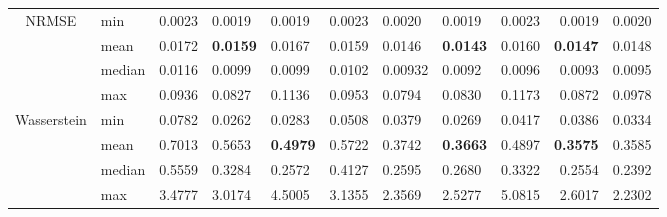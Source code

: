 \begin{table}[tbp]
\begin{tabular}{clllllllrrr}
\multirow{4}{*}{NRMSE}       & \multicolumn{1}{l|}{min}    & 0.0023                     & 0.0019                      & \multicolumn{1}{l|}{0.0019}          & 0.0023                & 0.0020                 & \multicolumn{1}{l|}{0.0019}          & 0.0023                     & 0.0019                     & 0.0020                     \\
                             & \multicolumn{1}{l|}{mean}   & 0.0172                     & \textbf{0.0159}             & \multicolumn{1}{l|}{0.0167}          & 0.0159                & 0.0146                 & \multicolumn{1}{l|}{\textbf{0.0143}} & 0.0160                     & \textbf{0.0147}            & 0.0148                     \\
                             & \multicolumn{1}{l|}{median} & 0.0116                     & 0.0099                      & \multicolumn{1}{l|}{0.0099}          & 0.0102                & 0.00932                 & \multicolumn{1}{l|}{0.0092}          & 0.0096                     & 0.0093                     & 0.0095                     \\
                             & \multicolumn{1}{l|}{max}    & 0.0936                     & 0.0827                      & \multicolumn{1}{l|}{0.1136}          & 0.0953                & 0.0794                 & \multicolumn{1}{l|}{0.0830}          & 0.1173                     & 0.0872                     & 0.0978                     \\ \hline
\multirow{4}{*}{Wasserstein} & \multicolumn{1}{l|}{min}    & 0.0782                     & 0.0262                      & \multicolumn{1}{l|}{0.0283}          & 0.0508                & 0.0379                 & \multicolumn{1}{l|}{0.0269}          & 0.0417 & 0.0386 & 0.0334 \\
                             & \multicolumn{1}{l|}{mean}   & 0.7013                     & 0.5653                      & \multicolumn{1}{l|}{\textbf{0.4979}} & 0.5722                & 0.3742                 & \multicolumn{1}{l|}{\textbf{0.3663}} & 0.4897                     & \textbf{0.3575}            & 0.3585                     \\
                             & \multicolumn{1}{l|}{median} & 0.5559                     & 0.3284                      & \multicolumn{1}{l|}{0.2572}          & 0.4127                & 0.2595                 & \multicolumn{1}{l|}{0.2680}          & 0.3322                     & 0.2554                     & 0.2392                     \\
                             & \multicolumn{1}{l|}{max}    & 3.4777                     & 3.0174                      & \multicolumn{1}{l|}{4.5005}          & 3.1355                & 2.3569                 & \multicolumn{1}{l|}{2.5277}          & 5.0815                     & 2.6017                     & 2.2302                     \\ \hline

\end{tabular}
\end{table}
